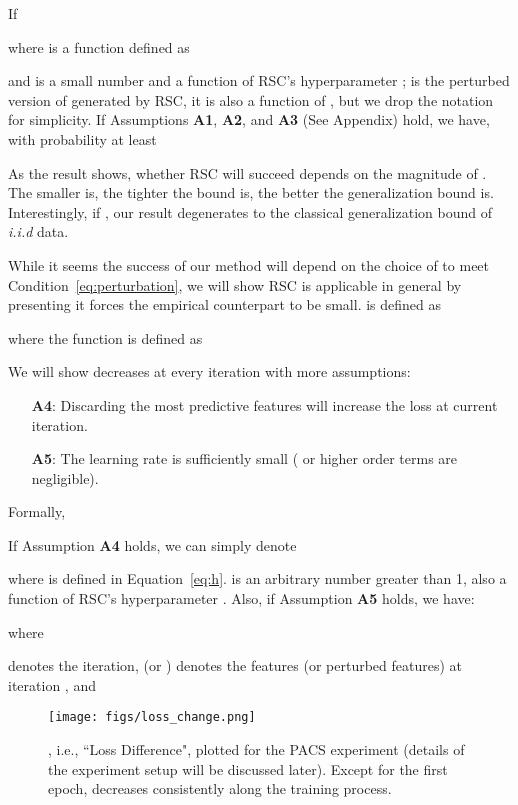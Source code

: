 \documentclass[runningheads]{llncs}
\newcommand{\method}{RSC}
\begin{document}
\begin{corollary}
If 

where  is a function defined as

and  is a small number and a function of \method{}'s hyperparameter ;
 is the perturbed version of  generated by \method{}, it is also a function of , but we drop the notation for simplicity.  
If Assumptions \textbf{A1}, \textbf{A2}, and \textbf{A3} (See Appendix) hold, 
we have, with probability at least 

\label{coro:main}
\end{corollary}



As the result shows, whether \method{} will succeed depends on the magnitude of . 
The smaller  is, the tighter the bound is, 
the better the generalization bound is. 
Interestingly, if , our result degenerates to the classical generalization bound of \textit{i.i.d} data. 

While it seems the success of our method will depend on the choice of  to meet Condition~\ref{eq:perturbation},
we will show \method{} is applicable in general by presenting it forces the empirical counterpart  to be small. 
 is defined as

where the function  is defined as

We will show  decreases at every iteration 
with more assumptions:
\begin{itemize}
\setlength{\itemindent}{.1in}
    \item [\textbf{A4}:] Discarding the most predictive features will increase the loss at current iteration. 
    \item [\textbf{A5}:] The learning rate  is sufficiently small ( or higher order terms are negligible). 
\end{itemize}

Formally,
\begin{corollary}
If Assumption \textbf{A4} holds, we can simply denote

where  is defined in Equation~\ref{eq:h}. 
 is an arbitrary number greater than 1, also a function of \method{}'s hyperparameter . 
Also, if Assumption \textbf{A5} holds, 
we have:

where

 denotes the iteration,  
 (or ) denotes the features (or perturbed features) at iteration , 
and 
\label{coro:2nd}
\end{corollary}


\begin{wrapfigure}{r}{0.5\textwidth}
\centering
\vspace{-30pt}
\texttt{[image: figs/loss\_change.png]}
\vspace{-10pt}
\caption{, i.e., ``Loss Difference", plotted for the PACS experiment (details of the experiment setup will be discussed later). Except for the first epoch,  decreases consistently along the training process.
}
\label{fig:IAG}
\end{wrapfigure}
\end{document}

